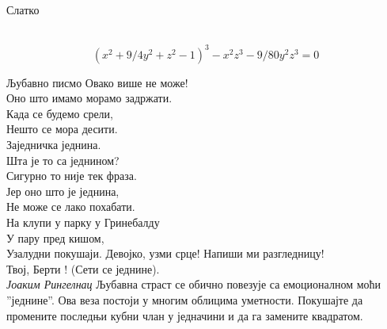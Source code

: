 \documentclass[sr]{./../../common/SurferDesc}%
\begin{document}
\footnotesize


\begin{surferPage}
  \begin{surferTitle}Слатко\end{surferTitle}   \\

\smallskip
\[(x^2+ 9/4y^2	+ z^2- 1)^3- x^2z^3	- 9/80y^2z^3	= 0\]

\singlespacing
Љубавно писмо
\singlespacing
Овако више не може!\\
Оно што имамо морамо задржати.\\
Када се будемо срели,\\
Нешто се мора десити.\\
Заједничка једнина.\\
Шта је то са једнином?\\
Сигурно то није тек фраза.\\
Јер оно што је једнина,\\
Не може се лако похабати.\\
На клупи у парку у Гринебалду\\
У пару пред кишом,\\
Узалудни покушаји. Девојко, узми срце! Напиши ми разгледницу!\\
Твој, Берти ! (Сети се једнине).\\
{\it Јоаким Рингелнац}
\singlespacing 
Љубавна страст се обично повезује са емоционалном моћи ''једнине''. Ова веза постоји у многим облицима уметности.
\singlespacing 
Покушајте да промените последњи кубни члан у једначини и да га замените квадратом.



  \begin{surferText}
     \end{surferText}
\end{surferPage}
\end{document}

